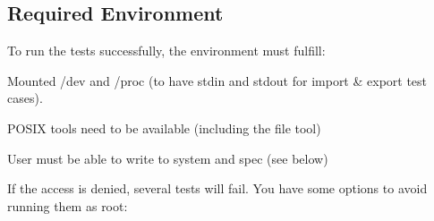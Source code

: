 \subsection*{Required Environment}

To run the tests successfully, the environment must fulfill\+:


\begin{DoxyItemize}
\item Mounted /dev and /proc (to have stdin and stdout for import \& export test cases).
\item P\+O\+S\+IX tools need to be available (including the {\ttfamily file} tool)
\item User must be able to write to system and spec (see below)
\end{DoxyItemize}

If the access is denied, several tests will fail. You have some options to avoid running them as root\+:



